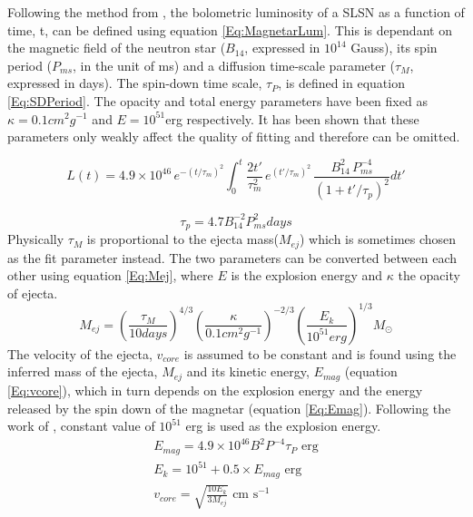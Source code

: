 Following the method from \cite{2013ApJ...770..128I}, the bolometric luminosity of a SLSN as a function of time, t, can be defined using equation \ref{Eq:MagnetarLum}. This is dependant on the magnetic field of the neutron star ($B_{14}$, expressed in $10^{14}$ Gauss), its spin period ($P_{ms}$, in the unit of ms) and a diffusion time-scale parameter ($\tau_M$, expressed in days). The spin-down time scale, $\tau_P$, is defined in equation \ref{Eq:SDPeriod}. The opacity and total energy parameters have been fixed as $\kappa = 0.1cm^2g^{-1}$ and $E = 10^{51}$erg respectively. It has been shown \citep{2013ApJ...770..128I,2014ApJ...796...87I,2015MNRAS.452.3869N,2015MNRAS.449.1215P} that these parameters only weakly affect the quality of fitting and therefore can be omitted.

\begin{equation}
\label{Eq:MagnetarLum}
L(t) = 4.9\times 10^{46}\,e^{ -(t / \tau_m)^2 } \int_{0}^{t} \frac{2t'}{\tau_m^2}\,e^{(t'/\tau_m)^2}\,\frac{B_{14}^{2}\,P_{ms}^{-4}}{(1+t'/\tau_{p})^2} dt'
\end{equation}

\begin{equation}
\label{Eq:SDPeriod}
\tau_{p} = 4.7B_{14}^{-2}P_{ms}^{2}days
\end{equation}
Physically $\tau_M$ is proportional to the ejecta mass($M_{ej}$) which is sometimes chosen as the fit parameter instead. The two parameters can be converted between each other using equation \ref{Eq:Mej}, where $E$ is the explosion energy and $\kappa$ the opacity of ejecta.
\begin{equation}
\label{Eq:Mej}
M_{ej} = (\frac{\tau_{M}}{10days})^{4/3}(\frac{\kappa}{0.1cm^2g^{-1}})^{-2/3}(\frac{E_k}{10^{51}erg})^{1/3}M_{\odot}
\end{equation}
The velocity of the ejecta, $v_{core}$ is assumed to be constant and is found using the inferred mass of the ejecta, $M_{ej}$ and its kinetic energy, $E_{mag}$ (equation \ref{Eq:vcore}), which in turn depends on the explosion energy and the energy released by the spin down of the magnetar (equation \ref{Eq:Emag}). Following the work of \cite{2013ApJ...770..128I,2013Natur.502..346N,2015MNRAS.452.3869N}, constant value of $10^{51}$ erg is used as the explosion energy.
\begin{align}
\label{Eq:Emag}
E_{mag} = 4.9\times10^{46} B^2 P^{-4} \tau_{P}  \text{ erg} \\
E_k = 10^{51} + 0.5 \times E_{mag} \text{ erg}\\
\label{Eq:vcore}
v_{core} =  \sqrt{\frac{10 E_{k}}{3 M_{ej}}} \text{ cm s}^{-1}
\end{align}

